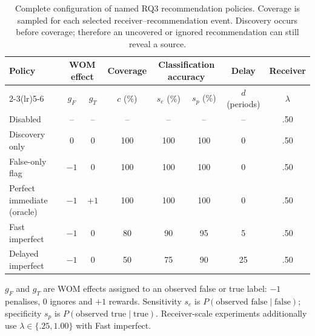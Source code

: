 \begin{table}[ht]
\centering
\caption{Complete configuration of named RQ3 recommendation policies. Coverage is sampled for each selected receiver--recommendation event. Discovery occurs before coverage; therefore an uncovered or ignored recommendation can still reveal a source.}
\label{tab:rq3-policy-configurations}
\small
\begin{tabular}{lccccccc}
\toprule
Policy & \multicolumn{2}{c}{WOM effect} & Coverage & \multicolumn{2}{c}{Classification accuracy} & Delay & Receiver \\
\cmidrule(lr){2-3}\cmidrule(lr){5-6}
 & $g_F$ & $g_T$ & $c$ (\%) & $s_e$ (\%) & $s_p$ (\%) & $d$ (periods) & $\lambda$ \\
\midrule
Disabled & -- & -- & -- & -- & -- & -- & .50 \\
Discovery only & 0 & 0 & 100 & 100 & 100 & 0 & .50 \\
False-only flag & $-1$ & 0 & 100 & 100 & 100 & 0 & .50 \\
Perfect immediate (oracle) & $-1$ & $+1$ & 100 & 100 & 100 & 0 & .50 \\
Fast imperfect & $-1$ & 0 & 80 & 90 & 95 & 5 & .50 \\
Delayed imperfect & $-1$ & 0 & 50 & 75 & 90 & 25 & .50 \\
\bottomrule
\end{tabular}
\vspace{1mm}

\footnotesize $g_F$ and $g_T$ are WOM effects assigned to an observed false or true label: $-1$ penalises, 0 ignores and $+1$ rewards. Sensitivity $s_e$ is $P(\text{observed false}\mid\text{false})$; specificity $s_p$ is $P(\text{observed true}\mid\text{true})$. Receiver-scale experiments additionally use $\lambda\in\{.25,1.00\}$ with Fast imperfect.
\end{table}

